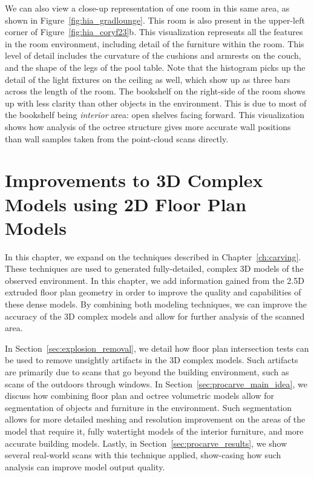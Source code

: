 \documentclass[12pt,onecolumn,oneside]{book}
\begin{document}
We can also view a close-up representation of one room in this same area, as shown in Figure~\ref{fig:hia_gradlounge}.  This room is also present in the upper-left corner of Figure~\ref{fig:hia_coryf23}b.  This visualization represents all the features in the room environment, including detail of the furniture within the room.  This level of detail includes the curvature of the cushions and armrests on the couch, and the shape of the legs of the pool table.  Note that the histogram picks up the detail of the light fixtures on the ceiling as well, which show up as three bars across the length of the room.  The bookshelf on the right-side of the room shows up with less clarity than other objects in the environment.  This is due to most of the bookshelf being {\it interior} area: open shelves facing forward.  This visualization shows how analysis of the octree structure gives more accurate wall positions than wall samples taken from the point-cloud scans directly.


\chapter{Improvements to 3D Complex Models using 2D Floor Plan Models}
\label{ch:better_carving}

In this chapter, we expand on the techniques described in Chapter~\ref{ch:carving}.  These techniques are used to generated fully-detailed, complex 3D models of the observed environment.  In this chapter, we add information gained from the 2.5D extruded floor plan geometry in order to improve the quality and capabilities of these dense models.  By combining both modeling techniques, we can improve the accuracy of the 3D complex models and allow for further analysis of the scanned area.

In Section~\ref{sec:explosion_removal}, we detail how floor plan intersection tests can be used to remove unsightly artifacts in the 3D complex models.  Such artifacts are primarily due to scans that go beyond the building environment, such as scans of the outdoors through windows.  In Section~\ref{sec:procarve_main_idea}, we discuss how combining floor plan and octree volumetric models allow for segmentation of objects and furniture in the environment.  Such segmentation allows for more detailed meshing and resolution improvement on the areas of the model that require it, fully watertight models of the interior furniture, and more accurate building models.  Lastly, in Section~\ref{sec:procarve_results}, we show several real-world scans with this technique applied, show-casing how such analysis can improve model output quality.
\end{document}
